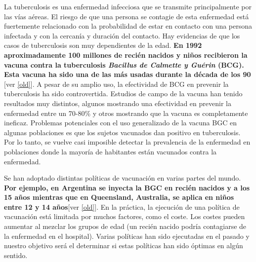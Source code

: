 \documentclass[
]{book}
\begin{document}
La tuberculosis es una enfermedad infecciosa que se transmite principalmente por las vías aéreas. El riesgo de que una persona se contagie de esta enfermedad está fuertemente relacionado con la probabilidad de estar en contacto con una persona infectada y con la cercanía y duración del contacto. Hay evidencias de que los casos de tuberculosis son muy dependientes de la edad. \textbf{En 1992 aproximadamente 100 millones de recién nacidos y niños recibieron la vacuna contra la tuberculosis \emph{Bacillus de Calmette y Guérin} (BCG). Esta vacuna ha sido una de las más usadas durante la década de los 90} {[}ver \ref{old}{]}. A pesar de su amplio uso, la efectividad de BCG en prevenir la tuberculosis ha sido controvertida. Estudios de campo de la vacuna han tenido resultados muy distintos, algunos mostrando una efectividad en prevenir la enfermedad entre un 70-80\% y otros mostrando que la vacuna es completamente ineficaz. Problemas potenciales con el uso generalizado de la vacuna BGC en algunas poblaciones es que los sujetos vacunados dan positivo en tuberculosis. Por lo tanto, se vuelve casi imposible detectar la prevalencia de la enfermedad en poblaciones donde la mayoría de habitantes están vacunados contra la enfermedad.

Se han adoptado distintas políticas de vacunación en varias partes del mundo. \textbf{Por ejemplo, en Argentina se inyecta la BGC en recién nacidos y a los 15 años mientras que en Queensland, Australia, se aplica en niños entre 12 y 14 años}{[}ver \ref{old}{]}. En la práctica, la ejecución de una política de vacunación está limitada por muchos factores, como el coste. Los costes pueden aumentar al mezclar los grupos de edad (un recién nacido podría contagiarse de la enfermedad en el hospital). Varias políticas han sido ejecutadas en el pasado y nuestro objetivo será el determinar si estas políticas han sido óptimas en algún sentido.
\end{document}
